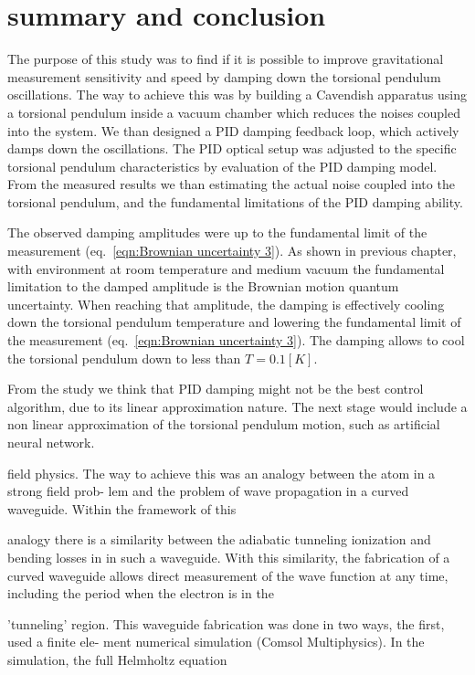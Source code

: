 \documentclass[\main/master.tex]{subfiles}
\begin{document}
\chapter{summary and conclusion}\label{chp:summary and conclusion}
The purpose of this study was to find if it is possible to improve gravitational measurement sensitivity and speed by damping down the torsional pendulum oscillations. The way to achieve this was by building a Cavendish apparatus using a torsional pendulum inside a vacuum chamber which reduces the noises coupled into the system. We than designed a PID damping feedback loop, which actively damps down the oscillations. The PID optical setup was adjusted to the specific torsional pendulum characteristics by evaluation of the PID damping model. From the measured results we than estimating the actual noise coupled into the torsional pendulum, and the fundamental limitations of the PID damping ability.
\par\noindent
The observed damping amplitudes were up to the fundamental limit of the measurement (eq.~\ref{eqn:Brownian uncertainty 3}). As shown in previous chapter, with environment at room temperature and medium vacuum the fundamental limitation to the damped amplitude is the Brownian motion quantum uncertainty. When reaching that amplitude, the damping is effectively cooling down the torsional pendulum temperature and lowering the fundamental limit of the measurement (eq.~\ref{eqn:Brownian uncertainty 3}). The damping allows to cool the torsional pendulum down to less than $T=0.1[K]$.
\par\noindent
From the study we think that PID damping might not be the best control algorithm, due to its linear approximation nature. The next stage would include a non linear approximation of the torsional pendulum motion, such as artificial neural network. 


field physics. The way to achieve this was an analogy between the atom in a strong field prob-
lem and the problem of wave propagation in a curved waveguide. Within the framework of this

analogy there is a similarity between the adiabatic tunneling ionization and bending losses in
in such a waveguide. With this similarity, the fabrication of a curved waveguide allows direct
measurement of the wave function at any time, including the period when the electron is in the

’tunneling’ region. This waveguide fabrication was done in two ways, the first, used a finite ele-
ment numerical simulation (Comsol Multiphysics). In the simulation, the full Helmholtz equation
\end{document}
